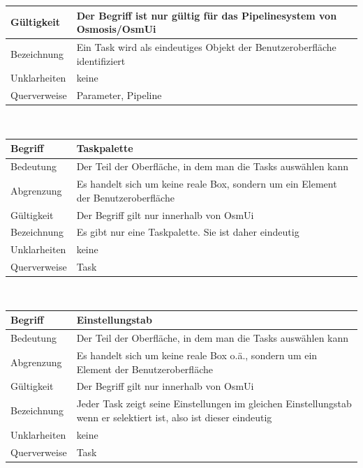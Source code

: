 \documentclass[a4paper,12pt]{scrartcl}
\begin{document}
\begin{center}
\begin{tabular}{|p{5cm}|p{10cm}|}
\hline Gültigkeit & Der Begriff ist nur gültig für das Pipelinesystem von Osmosis/OsmUi\\ 
\hline Bezeichnung & Ein Task wird als eindeutiges Objekt der Benutzeroberfläche identifiziert\\ 
\hline Unklarheiten & keine \\ 
\hline Querverweise & Parameter, Pipeline\\ 
\hline 
\end{tabular}
\vspace{0.7cm}
\\
\begin{tabular}{|p{5cm}|p{10cm}|}
\hline Begriff & \textbf{Taskpalette} \\ 
\hline Bedeutung & Der Teil der Oberfläche, in dem man die Tasks auswählen kann  \\ 
\hline Abgrenzung & Es handelt sich um keine reale Box, sondern um ein Element der Benutzeroberfläche\\ 
\hline Gültigkeit & Der Begriff gilt nur innerhalb von OsmUi \\ 
\hline Bezeichnung & Es gibt nur eine Taskpalette. Sie ist daher eindeutig \\ 
\hline Unklarheiten & keine \\ 
\hline Querverweise & Task \\ 
\hline 
\end{tabular}
\vspace{0.7cm}
\\
\begin{tabular}{|p{5cm}|p{10cm}|}
\hline Begriff & \textbf{Einstellungstab} \\ 
\hline Bedeutung & Der Teil der Oberfläche, in dem man die Tasks auswählen kann  \\ 
\hline Abgrenzung & Es handelt sich um keine reale Box o.ä., sondern um ein Element der Benutzeroberfläche\\ 
\hline Gültigkeit & Der Begriff gilt nur innerhalb von OsmUi \\ 
\hline Bezeichnung & Jeder Task zeigt seine Einstellungen im gleichen Einstellungstab wenn er selektiert ist, also ist dieser eindeutig \\ 
\hline Unklarheiten & keine \\ 
\hline Querverweise & Task \\ 
\hline 
\end{tabular}
\vspace{0.7cm}
\\
\begin{tabular}{|p{5cm}|p{10cm}|}

\end{tabular}
\end{center}
\end{document}
